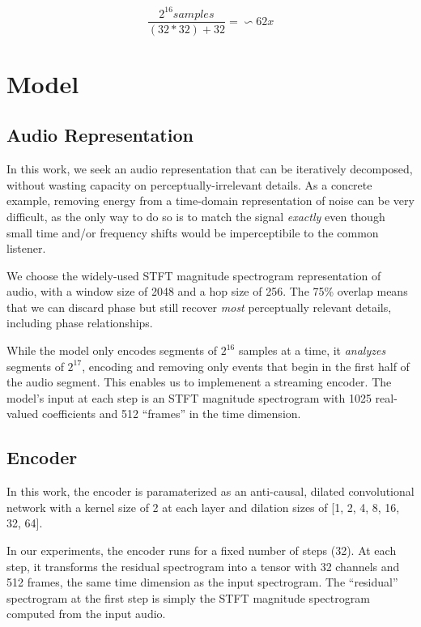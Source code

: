 \documentclass[9pt,conference]{IEEEtran}
\begin{document}
\begin{equation}
  \label{eq:wave_equation}
    \frac{2^{16} samples}{(32 * 32) + 32} = \backsim62x
\end{equation}

\section{Model}
\label{sec:model}

\subsection{Audio Representation}
\label{ssec:audio_representation}

In this work, we seek an audio representation that can be iteratively decomposed, 
without wasting capacity on perceptually-irrelevant details.  As a concrete example, 
removing energy from a time-domain representation of noise can be very difficult, as the
only way to do so is to match the signal \emph{exactly} even though small time and/or
frequency shifts would be imperceptibile to the common listener.

We choose the widely-used STFT magnitude spectrogram representation of audio, with a 
window size of 2048 and a hop size of 256.  The 75\% overlap means that we can discard
phase but still recover \emph{most} perceptually relevant details, including phase relationships.

While the model only encodes segments of ${2^{16}}$ samples at a time, 
it \emph{analyzes} segments of ${2^{17}}$, encoding and removing only events that 
begin in the first half of the audio segment.  This enables us to implemenent a streaming 
encoder.  The model's input at each step is an STFT magnitude spectrogram with 1025 real-valued coefficients 
and 512 ``frames'' in the time dimension.

\subsection{Encoder}
\label{ssec:encoder}

In this work, the encoder is paramaterized as an anti-causal, 
dilated convolutional network with a kernel size of 2 at 
each layer and dilation sizes of [1, 2, 4, 8, 16, 32, 64].

In our experiments, the encoder runs for a fixed number of steps (32).  At each step,
it transforms the residual spectrogram into a tensor with 32 channels and 512 frames, 
the same time dimension as the input spectrogram.  The ``residual'' spectrogram at the first step
is simply the STFT magnitude spectrogram computed from the input audio.
\end{document}

